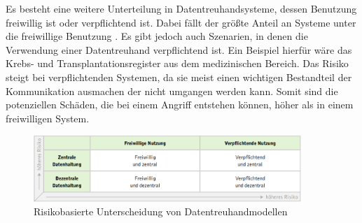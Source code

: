 \documentclass{scrreprt}
\begin{document}
Es besteht eine weitere Unterteilung in Datentreuhandsysteme, dessen Benutzung freiwillig ist oder verpflichtend ist. Dabei fällt der größte Anteil an Systeme unter die freiwillige Benutzung . Es gibt jedoch auch Szenarien, in denen die Verwendung einer Datentreuhand verpflichtend ist. Ein Beispiel hierfür wäre das Krebs- und Transplantationsregister aus dem medizinischen Bereich. Das Risiko steigt bei verpflichtenden Systemen, da sie meist einen wichtigen Bestandteil der Kommunikation ausmachen der nicht umgangen werden kann. Somit sind die potenziellen Schäden, die bei einem Angriff entstehen können, höher als in einem freiwilligen System.

\begin{figure}
    \centering
    \includegraphics[width=0.9\textwidth]{DT-RisikoEinteilung.png}
    \caption{Risikobasierte Unterscheidung von Datentreuhandmodellen \cite{dt-blankertz2021neue}}
    \label{fig:dt-risikoeinteilug}
\end{figure}
\end{document}
